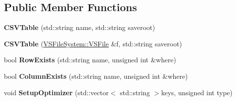\subsection*{Public Member Functions}
\begin{DoxyCompactItemize}
\item 
{\bfseries C\+S\+V\+Table} (std\+::string name, std\+::string saveroot)\hypertarget{classCSVTable_ad1c690add30b68ea2022d2f89b9d4520}{}\label{classCSVTable_ad1c690add30b68ea2022d2f89b9d4520}

\item 
{\bfseries C\+S\+V\+Table} (\hyperlink{classVSFileSystem_1_1VSFile}{V\+S\+File\+System\+::\+V\+S\+File} \&f, std\+::string saveroot)\hypertarget{classCSVTable_a435af710fd6b74cbf118a9a9b97abd00}{}\label{classCSVTable_a435af710fd6b74cbf118a9a9b97abd00}

\item 
bool {\bfseries Row\+Exists} (std\+::string name, unsigned int \&where)\hypertarget{classCSVTable_a63d9a4d59cec92b262ab2259fe003a8d}{}\label{classCSVTable_a63d9a4d59cec92b262ab2259fe003a8d}

\item 
bool {\bfseries Column\+Exists} (std\+::string name, unsigned int \&where)\hypertarget{classCSVTable_a3412e97aa17da155aa5f7d2eeb20f913}{}\label{classCSVTable_a3412e97aa17da155aa5f7d2eeb20f913}

\item 
void {\bfseries Setup\+Optimizer} (std\+::vector$<$ std\+::string $>$keys, unsigned int type)\hypertarget{classCSVTable_af78f8e456ed312500a7dd179a9ae891f}{}\label{classCSVTable_af78f8e456ed312500a7dd179a9ae891f}

\end{DoxyCompactItemize}
